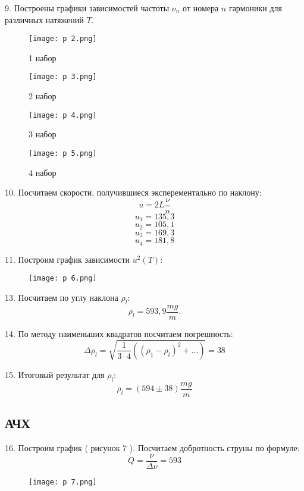 9. Построены графики зависимостей частоты $\nu_n$ от номера $n$ гармоники для различных натяжений $T$.
\begin{figure}[H]
    \centering
\texttt{[image: p 2.png]}
    \caption{1 набор}
    \label{fig:my_label}
\end{figure}
\begin{figure}[H]
    \centering
\texttt{[image: p 3.png]}
    \caption{2 набор}
    \label{fig:my_label}
\end{figure}
\begin{figure}[H]
    \centering
\texttt{[image: p 4.png]}
    \caption{3 набор}
    \label{fig:my_label}
\end{figure}
\begin{figure}[H]
    \centering
\texttt{[image: p 5.png]}
    \caption{4 набор}
    \label{fig:my_label}
\end{figure}

10. Посчитаем скорости, получившиеся эксперементально по наклону:
\[u = 2L\frac\nu n\]
\[u_1 = 135,3\]
\[u_2 = 105,1\]
\[u_3 = 169,3\]
\[u_4 = 181,8\]

11. Построим график зависимости $u^2\left(T\right)$:
\begin{figure}[H]
    \centering
\texttt{[image: p 6.png]}
    \caption{}
    \label{fig:my_label}
\end{figure}

13. Посчитаем по углу наклона $\rho_l$:
\[\rho_l = 593,9 \frac{mg}{m}.\]

14. По методу наименьших квадратов посчитаем погрешность:
\[\Delta\rho_l = \sqrt{\frac{1}{3\cdot4}\left(\left(\rho_1 - \rho_l\right)^2+\dots\right)} = 38\]

15. Итоговый результат для $\rho_l$:
\[\rho_l = \left(594 \pm 38\right) \frac{mg}{m}\]

\subsection{АЧХ}

16. Построим график ( рисунок 7 ). Посчитаем добротность струны по формуле:
\[Q = \frac{\nu}{\Delta\nu} = 593\]

\begin{figure}[H]
    \centering
\texttt{[image: p 7.png]}
    \caption{}
    \label{fig:my_label}
\end{figure}
